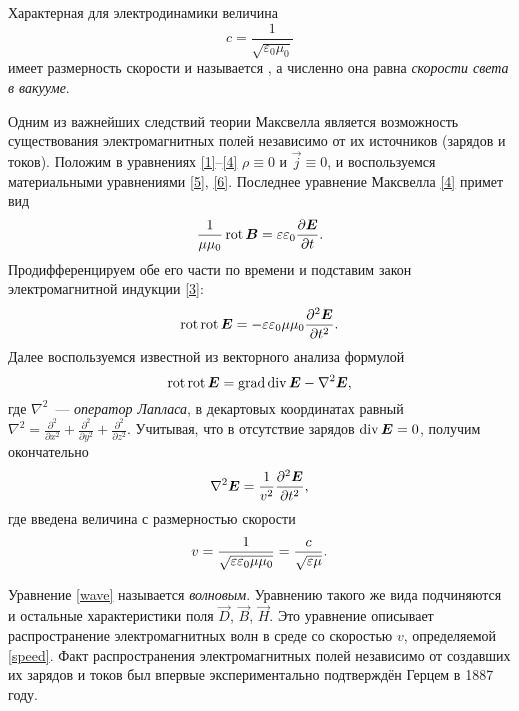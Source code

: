 Характерная для электродинамики величина
\[
c=\frac{1}{\sqrt{\varepsilon_0\mu_0}}
\]
имеет размерность скорости и называется , 
а численно она равна \emph{скорости света в вакууме}.

\label{sec:emwaves}

Одним из важнейших следствий теории Максвелла является возможность существования
электромагнитных полей независимо от их источников (зарядов и токов).
Положим в уравнениях \eqref{1}--\eqref{4} $\rho\equiv 0$ и $\vec{j}\equiv 0$,
и воспользуемся материальными уравнениями \eqref{5}, \eqref{6}.
Последнее уравнение Максвелла \eqref{4} примет вид
\[
\frac{1}{\mu \mu_0} \mathop{\mathrm{rot}} {\boldsymbol{B}} =  \varepsilon \varepsilon_0 \frac{\partial {\boldsymbol{E}}}{\partial t}.
\]
Продифференцируем обе его части по времени и подставим закон электромагнитной индукции \eqref{3}:
\[
\mathop{\mathrm{rot}}\mathop{\mathrm{rot}} {\boldsymbol{E}} = -\varepsilon\varepsilon_0 \mu\mu_0 \frac{\partial^2 {\boldsymbol{E}}}{\partial t^2}.
\]
Далее воспользуемся известной из векторного анализа формулой
\begin{equation} \eqmark{rotrot}
\Rot\Rot\vec{E}=\Grad\Div\vec{E}-\nabla^2\vec{E},
\end{equation}
где $\nabla^2$~--- \emph{оператор Лапласа}, в декартовых координатах равный
$\nabla^2 = \frac{\partial^2}{\partial x^2} + 
\frac{\partial^2}{\partial y^2}+
\frac{\partial^2}{\partial z^2}$.
Учитывая, что в отсутствие зарядов $\mathop{\mathrm{div}}{\boldsymbol{E}}=0$, получим окончательно
\begin{equation} \eqmark{wave}
\nabla^2\vec{E}=\frac{1}{v^2} \frac{\partial^2 \vec{E}}{\partial t^2},
\end{equation}
где введена величина с размерностью скорости
\begin{equation}\eqmark{speed}
v = \frac{1}{\sqrt{\varepsilon\varepsilon_0 \mu \mu_0}}= \frac{c}{\sqrt{\varepsilon\mu}}.
\end{equation}

Уравнение \eqref{wave} называется \emph{волновым}. Уравнению такого же вида 
подчиняются и остальные характеристики поля $\vec{D}$, $\vec{B}$, $\vec{H}$. 
Это уравнение описывает распространение электромагнитных волн в среде со скоростью $v$,
определяемой \eqref{speed}. Факт распространения электромагнитных полей независимо
от создавших их зарядов и токов был впервые экспериментально подтверждён
Герцем в 1887 году.


